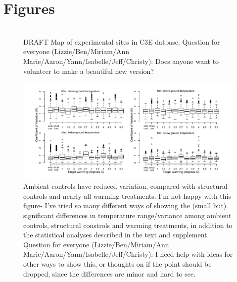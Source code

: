 \documentclass{article}
\begin{document}
\section* {Figures}
\begin{figure}[p]
\centering
\includegraphics{../Analyses/maps/expsites.pdf}  
\caption{DRAFT Map of experimental sites in C3E datbase. Question for everyone (Lizzie/Ben/Miriam/Ann Marie/Aaron/Yann/Isabelle/Jeff/Christy): Does anyone want to volunteer to make a beautiful new version?} 
\label{fig:map}
\end{figure}
\begin{figure}[p]
\centering
\includegraphics{../Analyses/figures/DRAFT_CVBytreatment.pdf} 
\caption{Ambient controls have reduced variation, compared with structural controls and nearly all warming treatments. I'm not happy with this figure- I've tried so many different ways of showing the (small but) significant differences in temperature range/variance among ambient controls, structural constrols and warming treatments, in addition to the statistical analyses described in the text and supplement. Question for everyone (Lizzie/Ben/Miriam/Ann Marie/Aaron/Yann/Isabelle/Jeff/Christy): I need help with ideas for other ways to show this, or thoughts on if the point should be dropped, since the differences are minor and hard to see.} %
 \label{fig:cv}
 \end{figure}
\clearpage
\end{document}
